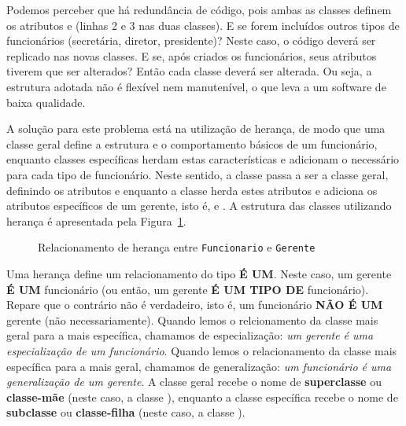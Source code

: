 Podemos perceber que há redundância de código, pois ambas as classes definem os atributos  e  (linhas 2 e 3 nas duas classes). E se forem incluídos outros tipos de funcionários (secretária, diretor, presidente)? Neste caso, o código deverá ser replicado nas novas classes. E se, após criados os funcionários, seus atributos tiverem que ser alterados? Então cada classe deverá ser alterada. Ou seja, a estrutura adotada não é flexível nem manutenível, o que leva a um software de baixa qualidade.

A solução para este problema está na utilização de herança, de modo que uma classe geral define a estrutura e o comportamento básicos de um funcionário, enquanto classes específicas herdam estas características e adicionam o necessário para cada tipo de funcionário. Neste sentido, a classe  passa a ser a classe geral, definindo os atributos  e  enquanto a classe  herda estes atributos e adiciona os atributos específicos de um gerente, isto é,  e . A estrutura das classes utilizando herança é apresentada pela Figura~\ref{fig:heranca-funcionario-gerente}.

\begin{figure}[h]
	\centering
	
	
	\caption{Relacionamento de herança entre \texttt{Funcionario} e \texttt{Gerente}}
	\label{fig:heranca-funcionario-gerente}
\end{figure}

Uma herança define um relacionamento do tipo \textbf{É UM}. Neste caso, um gerente \textbf{É UM} funcionário (ou então, um gerente \textbf{É UM TIPO DE} funcionário). Repare que o contrário não é verdadeiro, isto é, um funcionário \textbf{NÃO É UM} gerente (não necessariamente). Quando lemos o relcionamento da classe mais geral para a mais específica, chamamos de especialização: \textit{um gerente é uma especialização de um funcionário}. Quando lemos o relacionamento da classe mais específica para a mais geral, chamamos de generalização: \textit{um funcionário é uma generalização de um gerente}. A classe geral recebe o nome de \textbf{superclasse} ou \textbf{classe-mãe} (neste caso, a classe ), enquanto a classe específica recebe o nome de \textbf{subclasse} ou \textbf{classe-filha} (neste caso, a classe ).

